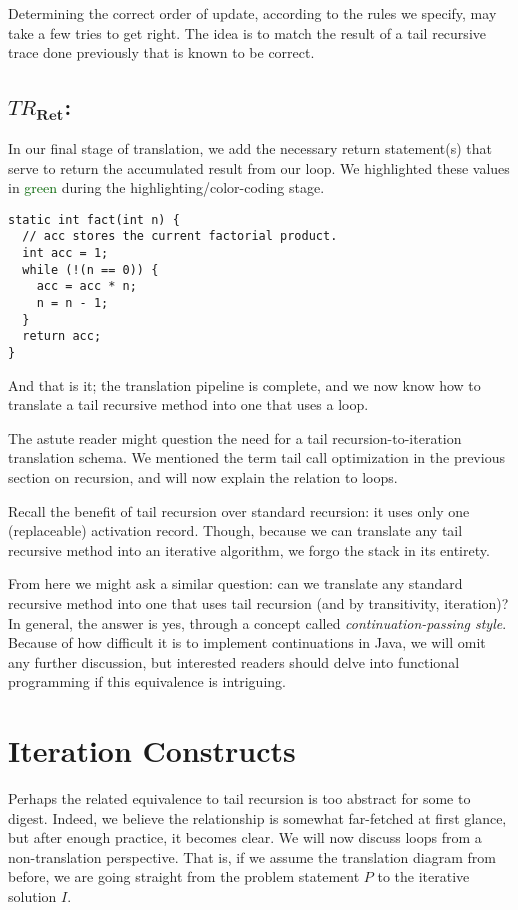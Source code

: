 Determining the correct order of update, according to the rules we specify, may take a few tries to get right. The idea is to match the result of a tail recursive trace done previously that is known to be correct.

\subsection{\emph{$TR_\mathbf{Ret}$}:}
In our final stage of translation, we add the necessary return statement(s) that serve to return the accumulated result from our loop. We highlighted these values in \textcolor{darkgreen}{green} during the highlighting/color-coding stage.


\begin{lstlisting}[language=MyJava]
static int fact(int n) {
  // acc stores the current factorial product. 
  int acc = 1;
  while (!(n == 0)) { 
    acc = acc * n;
    n = n - 1;
  }
  return acc;
}
\end{lstlisting}

And that is it; the translation pipeline is complete, and we now know how to translate a tail recursive method into one that uses a loop.

The astute reader might question the need for a tail recursion-to-iteration translation schema. We mentioned the term tail call optimization in the previous section on recursion, and will now explain the relation to loops.

Recall the benefit of tail recursion over standard recursion: it uses only one (replaceable) activation record. Though, because we can translate any tail recursive method into an iterative algorithm, we forgo the stack in its entirety.

From here we might ask a similar question: can we translate any standard recursive method into one that uses tail recursion (and by transitivity, iteration)? In general, the answer is yes, through a concept called \emph{continuation-passing style}. Because of how difficult it is to implement continuations in Java, we will omit any further discussion, but interested readers should delve into functional programming if this equivalence is intriguing.

\section{Iteration Constructs}

Perhaps the related equivalence to tail recursion is too abstract for some to digest. Indeed, we believe the relationship is somewhat far-fetched at first glance, but after enough practice, it becomes clear. We will now discuss loops from a non-translation perspective. That is, if we assume the translation diagram from before, we are going straight from the problem statement $P$ to the iterative solution $I$.

